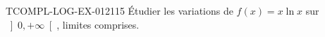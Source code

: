 \begin{exercice}{TCOMPL-LOG-EX-012}{1}{15}
Étudier les variations de $f(x) = x\ln x$ sur $\left]0, +\infty\right[$, limites comprises.

\end{exercice}
